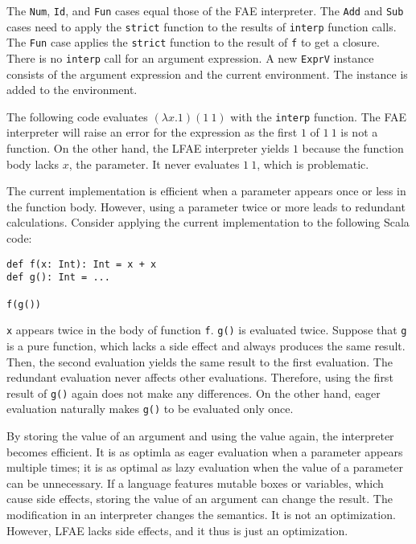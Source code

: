 The \verb!Num!, \verb!Id!, and \verb!Fun! cases equal those of the FAE
interpreter. The \verb!Add! and \verb!Sub! cases need to apply the \verb!strict!
function to the results of \verb!interp! function calls. The \verb!Fun! case
applies the \verb!strict! function to the result of \verb!f! to get a closure.
There is no \verb!interp! call for an argument expression. A new \verb!ExprV!
instance consists of the argument expression and the current environment. The
instance is added to the environment.

The following code evaluates \((\lambda x.1)(1\ 1)\) with the \verb!interp!
function. The FAE interpreter will raise an error for the expression as the first
\(1\) of \(1\ 1\) is not a function. On the other hand, the LFAE interpreter
yields \(1\) because the function body lacks \(x\), the parameter. It never
evaluates \(1\ 1\), which is problematic.

The current implementation is efficient when a parameter appears once or less in
the function body. However, using a parameter twice or more leads to redundant
calculations. Consider applying the current implementation to the following Scala
code:

\begin{verbatim}
def f(x: Int): Int = x + x
def g(): Int = ...

f(g())
\end{verbatim}

\verb!x! appears twice in the body of function \verb!f!. \verb!g()! is evaluated
twice. Suppose that \verb!g! is a pure function, which lacks a side effect and
always produces the same result. Then, the second evaluation yields the same
result to the first evaluation. The redundant evaluation never affects other
evaluations. Therefore, using the first result of \verb!g()! again does not make
any differences. On the other hand, eager evaluation naturally makes \verb!g()!
to be evaluated only once.

By storing the value of an argument and using the value again, the interpreter
becomes efficient. It is as optimla as eager evaluation when a parameter appears
multiple times; it is as optimal as lazy evaluation when the value of a parameter
can be unnecessary. If a language features mutable boxes or variables, which
cause side effects, storing the value of an argument can change the result. The
modification in an interpreter changes the semantics. It is not an optimization.
However, LFAE lacks side effects, and it thus is just an optimization.

